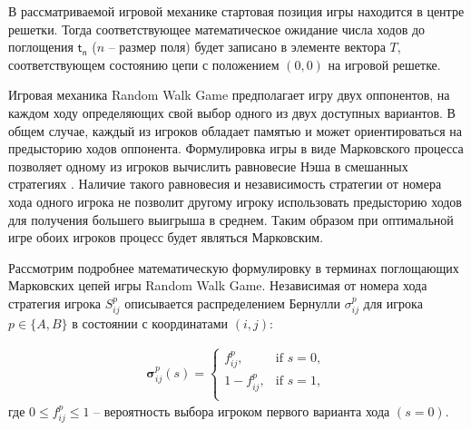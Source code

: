 В рассматриваемой игровой механике стартовая позиция игры находится в центре решетки. 
Тогда соответствующее математическое ожидание числа ходов до поглощения $\boldsymbol{\mathsf{t_n}}$ ($n$ -- размер поля) 
будет записано в элементе вектора $T$, соответствующем состоянию цепи с положением $(0, 0)$ на игровой решетке.

Игровая механика Random Walk Game предполагает игру двух оппонентов, на каждом ходу определяющих свой выбор одного из двух доступных вариантов.
В общем случае, каждый из игроков обладает памятью и может ориентироваться на предысторию ходов оппонента.
Формулировка игры в виде Марковского процесса позволяет одному из игроков вычислить равновесие Нэша в смешанных стратегиях \cite{nash_non-cooperative_1951}.
Наличие такого равновесия и независимость стратегии от номера хода одного игрока не позволит другому игроку использовать предысторию ходов
для получения большего выигрыша в среднем. Таким образом при оптимальной игре обоих игроков процесс будет являться Марковским.

Рассмотрим подробнее математическую формулировку в терминах поглощающих Марковских цепей игры Random Walk Game.
Независимая от номера хода стратегия игрока $S_{ij}^p$ описывается распределением Бернулли $\sigma_{ij}^p$ для игрока 
$p \in \{A, B\}$ в состоянии с координатами $(i, j)$:

\begin{equation}
    \begin{aligned}
    \boldsymbol{\sigma}_{ij}^p(s)=
    \begin{cases}
        f_{ij}^p, &\mbox{if } s = 0,\\ 
        1-f_{ij}^p, &\mbox{if } s = 1,\\
    \end{cases}
    \label{eq:sigma}
    \end{aligned}
\end{equation}
где $0 \leq f_{ij}^p \leq 1$ -- вероятность выбора игроком первого варианта хода $(s=0)$.

